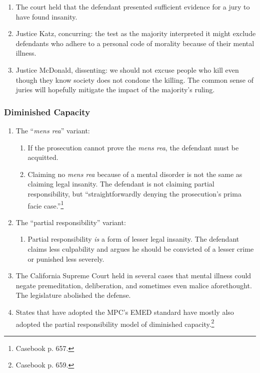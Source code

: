\begin{enumerate}
    \item The court held that the defendant presented sufficient evidence for a jury to have found insanity.
    \item Justice Katz, concurring: the test as the majority interpreted it might exclude defendants who adhere to a personal code of morality because of their mental illness.
    \item Justice McDonald, dissenting: we should not excuse people who kill even though they know society does not condone the killing. The common sense of juries will hopefully mitigate the impact of the majority's ruling.
\end{enumerate}

\subsubsection{Diminished Capacity}

\begin{enumerate}
    \item The ``\emph{mens rea}'' variant:
    \begin{enumerate}
        \item If the prosecution cannot prove the \emph{mens rea}, the defendant must be acquitted.
        \item Claiming no \emph{mens rea} because of a mental disorder is not the same as claiming legal insanity. The defendant is not claiming partial responsibility, but ``straightforwardly denying the prosecution's prima facie case.''\footnote{Casebook p. 657.}
    \end{enumerate}
    \item The ``partial responsibility'' variant:
    \begin{enumerate}
        \item Partial responsibility \emph{is} a form of lesser legal insanity. The defendant claims less culpability and argues he should be convicted of a lesser crime or punished less severely.
    \end{enumerate}
    \item The California Supreme Court held in several cases that mental illness could negate premeditation, deliberation, and sometimes even malice aforethought. The legislature abolished the defense.
    \item States that have adopted the MPC's EMED standard have mostly also adopted the partial responsibility model of diminished capacity.\footnote{Casebook p. 659.}
\end{enumerate}

